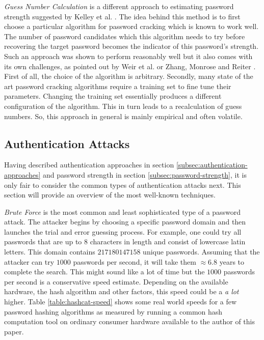 \emph{Guess Number Calculation} is a different approach to estimating password strength suggested by Kelley et al. \cite{kelley2012guess}. The idea behind this method is to first choose a particular algorithm for password cracking which is known to work well. The number of password candidates which this algorithm needs to try before recovering the target password becomes the indicator of this password's strength. Such an approach was shown to perform reasonably well but it also comes with its own challenges, as pointed out by Weir et al. \cite{weir2010testing} or Zhang, Monrose and Reiter \cite{zhang2010security}. First of all, the choice of the algorithm is arbitrary. Secondly, many state of the art password cracking algorithms require a training set to fine tune their parameters. Changing the training set essentially produces a different configuration of the algorithm. This in turn leads to a recalculation of guess numbers. So, this approach in general is mainly empirical and often volatile.

\subsection{Authentication Attacks}
\label{subsec:authentication-attacks}

Having described authentication approaches in section \ref{subsec:authentication-approaches} and password strength in section \ref{subsec:password-strength}, it is only fair to consider the common types of authentication attacks next. This section will provide an overview of the most well-known techniques.

\emph{Brute Force} is the most common and least sophisticated type of a password attack. The attacker begins by choosing a specific password domain and then launches the trial and error guessing process. For example, one could try all passwords that are up to 8 characters in length and consist of lowercase latin letters. This domain contains \(217180147158\) unique passwords. Assuming that the attacker can try \(1000\) passwords per second, it will take them \(\approx 6.8\) years to complete the search. This might sound like a lot of time but the \(1000\) passwords per second is a conservative speed estimate. Depending on the available hardware, the hash algorithm and other factors, this speed could be a \emph{a lot} higher. Table \ref{table:hashcat-speed} shows some real world speeds for a few password hashing algorithms as measured by running a common hash computation tool on ordinary consumer hardware available to the author of this paper.

